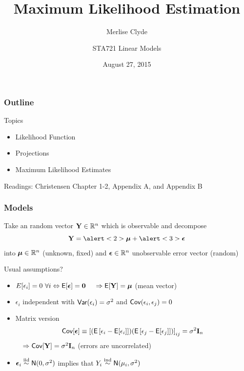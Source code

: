 \documentclass{beamer}
\title{Maximum Likelihood Estimation}
\subtitle{Merlise Clyde}
\author{STA721 Linear Models}
\institute{Duke University}
\date{August 27, 2015}
\begin{document}
\maketitle
\begin{frame}\frametitle{Outline}
Topics
  \begin{itemize}
 \item Likelihood Function
  \item Projections
  \item Maximum Likelihood Estimates


  \end{itemize}


Readings: Christensen Chapter 1-2, Appendix A, and Appendix B
\end{frame}


\begin{frame}
  \frametitle{Models}
Take an random vector $\mathbf{Y} \in \mathbb{R}^n$ which is observable and decompose  \pause
$$ \Y = \alert<2>{\mub} + \alert<3>{\eps}$$
into  \alert<2>{$\boldsymbol{\mu} \in \mathbb{R}^n$ (unknown, fixed)} \pause and
\alert<3>{$\boldsymbol{\epsilon} \in \mathbb{R}^n$ unobservable error vector (random)}
\pause

\vspace{18pt}
Usual assumptions? \pause
\begin{itemize}
\item $E[\epsilon_i] = 0 \ \forall i \Leftrightarrow \textsf{E}[\boldsymbol{\epsilon}] = \mathbf{0}$ \pause  $ \quad \Rightarrow \textsf{E}[\mathbf{Y}] = \boldsymbol{\mu}$
  (mean vector) \pause
\item $\epsilon_i$ independent with $\textsf{Var}(\epsilon_i) = \sigma^2$ and
  $\textsf{Cov}(\epsilon_i, \epsilon_j) = 0$  
\item Matrix version $$\textsf{Cov}[\boldsymbol{\epsilon}] \equiv \left[ (\textsf{E}\left[\epsilon_i -
  \textsf{E}[\epsilon_i]\right])(\textsf{E}\left[\epsilon_j - \textsf{E}[\epsilon_j]\right])\right]_{ij} = \sigma^2 \mathbf{I}_n$$   \pause  $ \quad \Rightarrow
  \textsf{Cov}[\mathbf{Y}] = \sigma^2 \mathbf{I}_n$  (errors are uncorrelated) \pause
\item $\boldsymbol{\epsilon}_i \mathrel{\mathop{\sim}\limits^{\rm iid}} \textsf{N}(0, \sigma^2)$  implies that $Y_i \mathrel{\mathop{\sim}\limits^{\rm ind}} \textsf{N}(\mu_i, \sigma^2)$
\end{itemize}

\end{frame}
\end{document}
